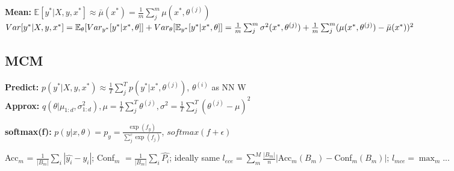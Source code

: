 \textbf{Mean:} $\mathbb{E}[y^*|X,y,x^*]  
\approx \bar{\mu}(x^*) 
=\frac{1}{m}\sum_j^m \mu(x^*, \theta^{(j)})$\\

$Var[y^*|X,y,x^*] = \mathbb{E}_\theta[Var_{y^*}[y^*|x^*, \theta]] + Var_\theta[\mathbb{E}_{y^*}[y^*|x^*, \theta]] \\
= \frac{1}{m}\sum_j^m \sigma^2(x^*, \theta^{(j)}) + \frac{1}{m}\sum_j^m (\mu(x^*, \theta^{(j)}) - \bar{\mu}(x^*))^2$\\
\begin{comment}
	The variance of the prediction is dependent on the variance of the weights.\\
	We can split up the uncertainty into Aleatoric (sigma-term) and epistemic (mu-term)\\
\end{comment}

\subsection{MCM}
\textbf{Predict:} $p(y^*| X,y,x^*) \approx \frac{1}{T} \sum_j^T p(y^*| x^*, \theta^{(j)})$, $\theta^{(i)}$ as NN W\\

\textbf{Approx:} $q(\theta| \mu_{1:d}, \sigma^2_{1:d}), \mu = \frac{1}{T} \sum_j^T \theta^{(j)},
\sigma^2 = \frac{1}{T} \sum_j^T (\theta^{(j)} - \mu)^2$\\
\begin{comment}
	We can keep track of the weight means and variances by keeping a running average while monte-carlo sampling.
	The parameters can then easily be approximated with a Gaussian.\\ 
\end{comment}

\textbf{softmax(f):} $p(y|x,\theta) = p_y = \frac{\exp(f_y)}{\sum_j^c \exp(f_j)}$, $softmax(f+\epsilon)$\\
\begin{comment}
	Gives probability distribution over the c classes.\\
	We can inject noise $softmax(f+\epsilon)$, saying that we are unsure about some parts of the predictive classes. This is analog to adding Epistemic noise, just for classification.\\
\end{comment}
Acc$_m$ = $\frac{1}{|B_m|} \sum_i |\hat{y_i} - y_i|$; Conf$_m$ $ = \frac{1}{|B_m|} \sum_i \hat{P_i} $; ideally same
$l_{ece} = \sum_m^M \frac{|B_m|}{n} |$Acc$_m(B_m) - $Conf$_m(B_m)|$; $l_{mce} = \max_m ...$